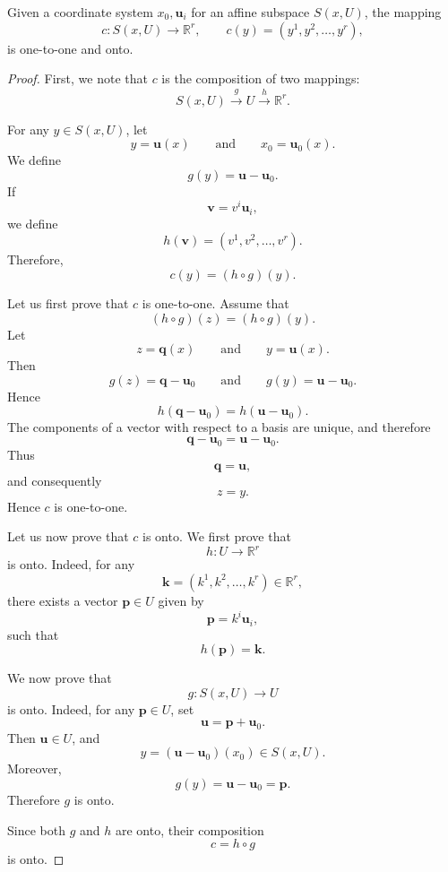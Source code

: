\documentclass[12pt]{article}
\begin{document}
\begin{proposition}
Given a coordinate system \(x_0,\mathbf{u}_i\) for an affine subspace
\(S(x,U)\), the mapping
\[
c:S(x,U)\longrightarrow\mathbb{R}^r,
\qquad
c(y)=\left(y^1,y^2,\ldots,y^r\right),
\]
is one-to-one and onto.
\end{proposition}

\begin{proof}
First, we note that \(c\) is the composition of two mappings:
\[
S(x,U)\xrightarrow{\,g\,}U\xrightarrow{\,h\,}\mathbb{R}^r.
\]

For any \(y\in S(x,U)\), let
\[
y=\mathbf{u}(x)
\qquad\text{and}\qquad
x_0=\mathbf{u}_0(x).
\]
We define
\[
g(y)=\mathbf{u}-\mathbf{u}_0.
\]
If
\[
\mathbf{v}=v^i\mathbf{u}_i,
\]
we define
\[
h(\mathbf{v})=\left(v^1,v^2,\ldots,v^r\right).
\]
Therefore,
\[
c(y)=(h\circ g)(y).
\]

Let us first prove that \(c\) is one-to-one. Assume that
\[
(h\circ g)(z)=(h\circ g)(y).
\]
Let
\[
z=\mathbf{q}(x)
\qquad\text{and}\qquad
y=\mathbf{u}(x).
\]
Then
\[
g(z)=\mathbf{q}-\mathbf{u}_0
\qquad\text{and}\qquad
g(y)=\mathbf{u}-\mathbf{u}_0.
\]
Hence
\[
h(\mathbf{q}-\mathbf{u}_0)
=
h(\mathbf{u}-\mathbf{u}_0).
\]
The components of a vector with respect to a basis are unique, and therefore
\[
\mathbf{q}-\mathbf{u}_0
=
\mathbf{u}-\mathbf{u}_0.
\]
Thus
\[
\mathbf{q}=\mathbf{u},
\]
and consequently
\[
z=y.
\]
Hence \(c\) is one-to-one.

Let us now prove that \(c\) is onto. We first prove that
\[
h:U\longrightarrow\mathbb{R}^r
\]
is onto. Indeed, for any
\[
\mathbf{k}=\left(k^1,k^2,\ldots,k^r\right)\in\mathbb{R}^r,
\]
there exists a vector \(\mathbf{p}\in U\) given by
\[
\mathbf{p}=k^i\mathbf{u}_i,
\]
such that
\[
h(\mathbf{p})=\mathbf{k}.
\]

We now prove that
\[
g:S(x,U)\longrightarrow U
\]
is onto. Indeed, for any \(\mathbf{p}\in U\), set
\[
\mathbf{u}=\mathbf{p}+\mathbf{u}_0.
\]
Then \(\mathbf{u}\in U\), and
\[
y=(\mathbf{u}-\mathbf{u}_0)(x_0)\in S(x,U).
\]
Moreover,
\[
g(y)=\mathbf{u}-\mathbf{u}_0=\mathbf{p}.
\]
Therefore \(g\) is onto.

Since both \(g\) and \(h\) are onto, their composition
\[
c=h\circ g
\]
is onto.
\end{proof}
\end{document}
